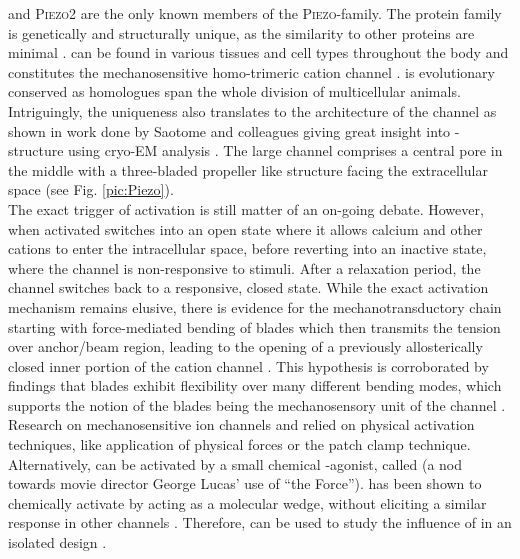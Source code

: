 \Piezo{} and \textsc{Piezo2} are the only known members of the \textsc{Piezo}-family. The protein family is genetically and structurally unique, as the similarity to other proteins are minimal \cite{Coste2010}. \Piezo{} can be found in various tissues and cell types throughout the body and constitutes the mechanosensitive homo-trimeric cation channel \Piezo{} \cite{Zhao2018}. \Piezo{} is evolutionary conserved as homologues span the whole division of multicellular animals. Intriguingly, the uniqueness also translates to the architecture of the channel as shown in work done by Saotome and colleagues giving great insight into \Piezo{}-structure using cryo-EM analysis \cite{Saotome2018}. The large channel comprises a central pore in the middle with a three-bladed propeller like structure facing the extracellular space (see Fig. \ref{pic:Piezo}). \\
The exact trigger of activation is still matter of an on-going debate. However, when activated \Piezo{} switches into an open state where it allows calcium and other cations to enter the intracellular space, before reverting into an inactive state, where the channel is non-responsive to stimuli. After a relaxation period, the channel switches back to a responsive, closed state. While the exact activation mechanism remains elusive, there is evidence for the mechanotransductory chain starting with force-mediated bending of blades which then transmits the tension over anchor/beam region, leading to the opening of a previously allosterically closed inner portion of the cation channel \cite{Zhao2018}. This hypothesis is corroborated by findings that blades exhibit flexibility over many different bending modes, which supports the notion of the blades being the mechanosensory unit of the channel \cite{Ge2015}.  Research on mechanosensitive ion channels and \Piezo{} relied on physical activation techniques, like application of physical forces or the patch clamp technique. Alternatively, \Piezo{} can be activated by a small chemical \Piezo{}-agonist, called \Yoda{} (a nod towards movie director George Lucas’ use of “the Force”). \Yoda{} has been shown to chemically activate \Piezo{} by acting as a molecular wedge, without eliciting a similar response in other channels \cite{Syeda2015, Lacroix2018}. Therefore, \Yoda{} can be used to study the influence of \Piezo{} in an isolated design \cite{Botello-Smith2019}.


